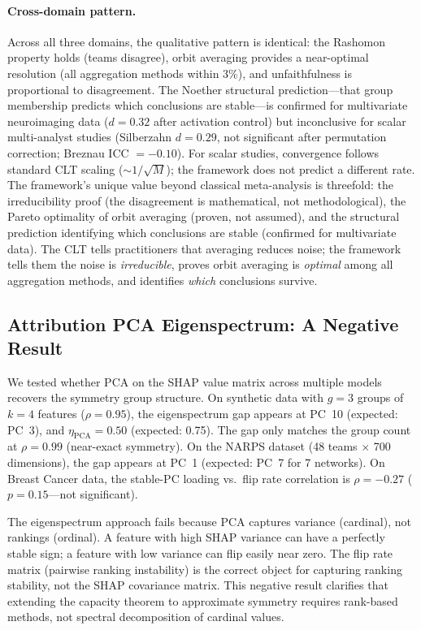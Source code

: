 \documentclass[11pt,a4paper]{article}
\begin{document}
\paragraph{Cross-domain pattern.}
Across all three domains, the qualitative pattern is identical: the Rashomon property holds (teams disagree), orbit averaging provides a near-optimal resolution (all aggregation methods within 3\%), and unfaithfulness is proportional to disagreement.  The Noether structural prediction---that group membership predicts which conclusions are stable---is confirmed for multivariate neuroimaging data ($d = 0.32$ after activation control) but inconclusive for scalar multi-analyst studies (Silberzahn $d = 0.29$, not significant after permutation correction; Breznau ICC $= -0.10$).  For scalar studies, convergence follows standard CLT scaling ($\sim 1/\sqrt{M}$); the framework does not predict a different rate.  The framework's unique value beyond classical meta-analysis is threefold: the irreducibility proof (the disagreement is mathematical, not methodological), the Pareto optimality of orbit averaging (proven, not assumed), and the structural prediction identifying which conclusions are stable (confirmed for multivariate data).  The CLT tells practitioners that averaging reduces noise; the framework tells them the noise is \emph{irreducible}, proves orbit averaging is \emph{optimal} among all aggregation methods, and identifies \emph{which} conclusions survive.

\subsection{Attribution PCA Eigenspectrum: A Negative Result}
\label{sec:attribution-pca}

We tested whether PCA on the SHAP value matrix across multiple models recovers the symmetry group structure.  On synthetic data with $g = 3$ groups of $k = 4$ features ($\rho = 0.95$), the eigenspectrum gap appears at PC~10 (expected: PC~3), and $\eta_{\text{PCA}} = 0.50$ (expected: 0.75).  The gap only matches the group count at $\rho = 0.99$ (near-exact symmetry).  On the NARPS dataset (48 teams $\times$ 700 dimensions), the gap appears at PC~1 (expected: PC~7 for 7 networks).  On Breast Cancer data, the stable-PC loading vs.\ flip rate correlation is $\rho = -0.27$ ($p = 0.15$---not significant).

The eigenspectrum approach fails because PCA captures variance (cardinal), not rankings (ordinal).  A feature with high SHAP variance can have a perfectly stable sign; a feature with low variance can flip easily near zero.  The flip rate matrix (pairwise ranking instability) is the correct object for capturing ranking stability, not the SHAP covariance matrix.  This negative result clarifies that extending the capacity theorem to approximate symmetry requires rank-based methods, not spectral decomposition of cardinal values.
\end{document}

